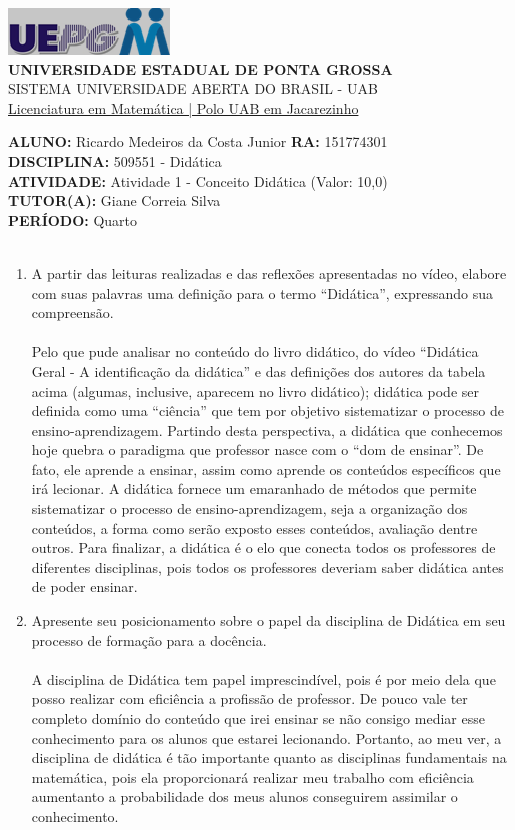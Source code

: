 \documentclass[a4paper, 12pt]{article}
\begin{document}
\begin{flushleft}\includegraphics{logo}\\
\textbf{UNIVERSIDADE ESTADUAL DE PONTA GROSSA} \\
SISTEMA UNIVERSIDADE ABERTA DO BRASIL - UAB \\
\underline{Licenciatura em Matemática | Polo UAB em Jacarezinho}\end{flushleft} 
\textbf{ALUNO:} Ricardo Medeiros da Costa Junior   \textbf{RA:} 151774301 \\
\textbf{DISCIPLINA:} 509551 - Didática \\
\textbf{ATIVIDADE:} Atividade 1 - Conceito Didática (Valor: 10,0) \\ 
\textbf{TUTOR(A):} Giane Correia Silva \\
\textbf{PERÍODO:} Quarto \\\\
\begin{enumerate}
\item A partir das leituras realizadas e das reflexões apresentadas no vídeo, elabore com suas palavras uma definição para o termo “Didática”, expressando sua compreensão.\\\\
  Pelo que pude analisar no conteúdo do livro didático, do vídeo ``Didática Geral - A identificação da didática'' e das definições dos autores da tabela acima (algumas, inclusive, aparecem no livro didático); didática pode ser definida como uma ``ciência'' que tem por objetivo sistematizar o processo de ensino-aprendizagem. Partindo desta perspectiva, a didática que conhecemos hoje quebra o paradigma que professor nasce com o ``dom de ensinar''. De fato, ele aprende a ensinar, assim como aprende os conteúdos específicos que irá lecionar. A didática fornece um emaranhado de métodos que permite sistematizar o processo de ensino-aprendizagem, seja a organização dos conteúdos, a forma como serão exposto esses conteúdos, avaliação dentre outros. Para finalizar, a didática é o elo que conecta todos os professores de diferentes disciplinas, pois todos os professores deveriam saber didática antes de poder ensinar.
\item Apresente seu posicionamento sobre o papel da disciplina de Didática em seu processo de formação para a docência. \\\\
  A disciplina de Didática tem papel imprescindível, pois é por meio dela que posso realizar com eficiência a profissão de professor. De pouco vale ter completo domínio do conteúdo que irei ensinar se não consigo mediar esse conhecimento para os alunos que estarei lecionando. Portanto, ao meu ver, a disciplina de didática é tão importante quanto as disciplinas fundamentais na matemática, pois ela proporcionará realizar meu trabalho com eficiência aumentanto a probabilidade dos meus alunos conseguirem assimilar o conhecimento.
\end{enumerate}  
\end{document}
